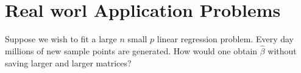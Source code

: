\section{Real worl Application Problems}

\begin{problembox}{}{}
Suppose we wish to fit a large $n$ small $p$ linear regression problem. Every day millions of new sample points are generated. How would one obtain $\hat{\beta}$ without saving larger and larger matrices?
\end{problembox}
